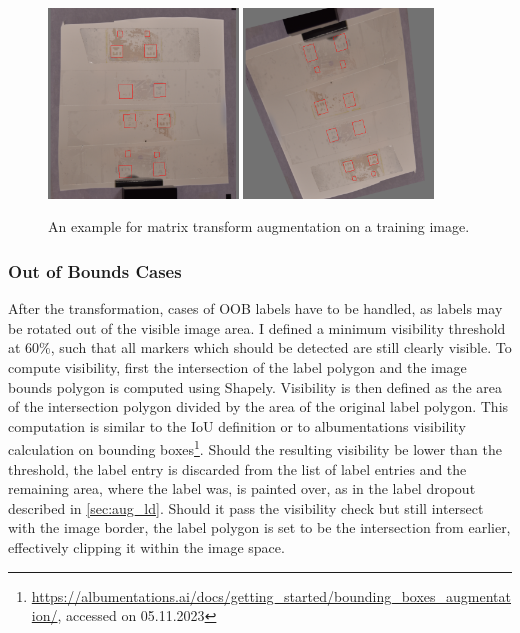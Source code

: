 \documentclass[10pt]{book}
\begin{document}
\begin{figure}
  \centering
     {\includegraphics[width=0.45\textwidth]{image/aug_mat_before}}
     {\includegraphics[width=0.45\textwidth]{image/aug_mat_after}}
  \caption{An example for matrix transform augmentation on a training image.}
  \label{fig:aug_mat_example}
\end{figure}

\subsubsection{Out of Bounds Cases}
\label{sec:oob}

After the transformation, cases of \ac{OOB} labels have to be handled, as labels may be rotated out of the visible image area. I defined a minimum visibility threshold at 60\%, such that all markers which should be detected are still clearly visible. To compute visibility, first the intersection of the label polygon and the image bounds polygon is computed using Shapely. Visibility is then defined as the area of the intersection polygon divided by the area of the original label polygon. This computation is similar to the \ac{IoU} definition or to albumentations visibility calculation on bounding boxes\footnote{\url{https://albumentations.ai/docs/getting_started/bounding_boxes_augmentation/}, accessed on 05.11.2023}. Should the resulting visibility be lower than the threshold, the label entry is discarded from the list of label entries and the remaining area, where the label was, is painted over, as in the label dropout described in \autoref{sec:aug_ld}. Should it pass the visibility check but still intersect with the image border, the label polygon is set to be the intersection from earlier, effectively clipping it within the image space.
\end{document}
